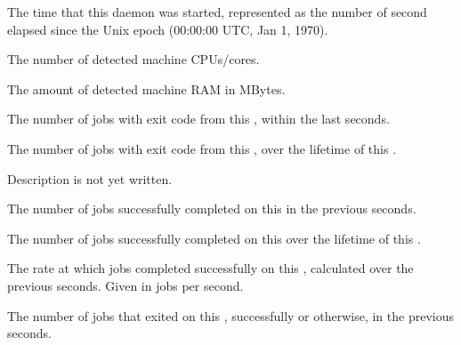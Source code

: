 \begin{description}

\item[\AdAttr{DaemonStartTime}:] The time that this daemon was
  started, represented as the number of second elapsed since
    the Unix epoch (00:00:00 UTC, Jan 1, 1970).

\item[\AdAttr{DetectedCpus}:] The number of detected machine CPUs/cores.

\item[\AdAttr{DetectedMemory}:] The amount of detected machine RAM in MBytes.

\item[\AdAttr{ExitCode<N>}:] The number of jobs with exit code
   from this ,
   within the last  seconds.

\item[\AdAttr{ExitCodeCumulative<N>}:] The number of jobs with exit 
  code  from this , over the lifetime of this
  .

\item[\AdAttr{JobQueueBirthdate}:] Description is not yet written.

\item[\AdAttr{JobsCompleted}:] The number of jobs successfully completed
  on this  in the previous  seconds.

\item[\AdAttr{JobsCompletedCumulative}:] The number of jobs 
  successfully completed on this  over the lifetime of this 
  .

\item[\AdAttr{JobCompletionRate}:] The rate at which jobs completed
  successfully on this , 
  calculated over the previous  seconds.
  Given in jobs per second.

\item[\AdAttr{JobsExited}:] The number of jobs that exited
  on this , successfully or otherwise, in the 
  previous  seconds.


\end{description}
